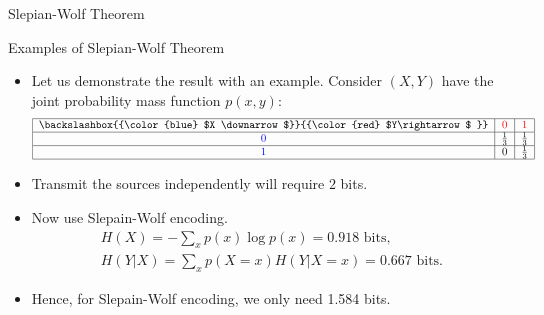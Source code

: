 \documentclass{beamer}
\newcommand{\red}[1]{{\color{red} #1}}
\newcommand{\blue}[1]{{\color{blue} #1}}
\begin{document}
{\begin{frame}{Slepian-Wolf Theorem}
\begin{itemize}
  \end{itemize}
\end{frame}

\begin{frame}{Examples of Slepian-Wolf Theorem}
 \begin{itemize}
	\justifying

\item<1-> Let us demonstrate the result with an example. Consider $(X,Y)$ have the joint probability mass function $p(x,y)$:
%
\begin{eqnarray*}
   \begin{tabular}{|c|c|c|c|}
        \hline
        \backslashbox{\blue{$X  \downarrow$}}{\red{$Y\rightarrow$ }} & \red{0} & \red{1} \\
       \hline
        \blue{0} & $\frac{1}{3}$ & $\frac{1}{3}$ \\
        \hline
        \blue{1} & 0 & $\frac{1}{3}$ \\
        \hline
    \end{tabular}
\end{eqnarray*}
%

\item<2-> Transmit the sources independently will require $2$ bits. 

\item<3-> Now use Slepain-Wolf encoding.
%
\begin{eqnarray*}
    H(X) = -\sum_{x} p(x)\log p(x) = 0.918 \mbox{ bits},\\
    H(Y|X) = \sum_{x} p(X=x)H(Y|X=x) = 0.667 \mbox{ bits}.
\end{eqnarray*}

\item<4-> Hence, for Slepain-Wolf encoding, we only need 1.584 bits.

	\end{itemize}
\end{frame}

}
\end{document}
